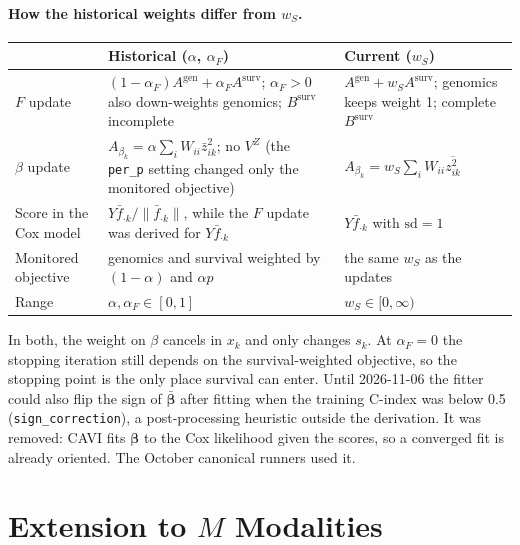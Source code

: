 \documentclass[11pt]{article}
\newcommand{\zbar}[2]{\bar{z}_{#1#2}}
\newcommand{\zsec}[2]{\overline{z^2_{#1#2}}}
\newcommand{\ws}{w_S}
\begin{document}
\paragraph{How the historical weights differ from $\ws$.}
\begin{center}
\begin{tabularx}{\textwidth}{>{\raggedright\arraybackslash}p{3.1cm}>{\raggedright\arraybackslash}X>{\raggedright\arraybackslash}X}
\toprule
 & Historical ($\alpha$, $\alpha_F$) & Current ($\ws$) \\
\midrule
$F$ update & $(1-\alpha_F)A^{\text{gen}} + \alpha_F A^{\text{surv}}$; $\alpha_F > 0$ also down-weights genomics; $B^{\text{surv}}$ incomplete & $A^{\text{gen}} + \ws A^{\text{surv}}$; genomics keeps weight 1; complete $B^{\text{surv}}$ \\
$\beta$ update & $A_{\beta_k} = \alpha\sum_i W_{ii}\zbar{i}{k}^2$; no $V^Z$ (the \texttt{per\_p} setting changed only the monitored objective) & $A_{\beta_k} = \ws\sum_i W_{ii}\zsec{i}{k}$ \\
Score in the Cox model & $Y\bar f_{\cdot k}/\lVert\bar f_{\cdot k}\rVert$, while the $F$ update was derived for $Y\bar f_{\cdot k}$ & $Y\bar f_{\cdot k}$ with $\mathrm{sd} = 1$ \\
Monitored objective & genomics and survival weighted by $(1-\alpha)$ and $\alpha p$ & the same $\ws$ as the updates \\
Range & $\alpha,\alpha_F\in[0,1]$ & $\ws\in[0,\infty)$ \\
\bottomrule
\end{tabularx}
\end{center}
In both, the weight on $\beta$ cancels in $x_k$ and only changes $s_k$. At $\alpha_F = 0$ the stopping iteration still depends on the
survival-weighted objective, so the stopping point is the only place survival
can enter. Until 2026-11-06 the fitter could also flip the sign of
$\bar{\bm\beta}$ after fitting when the training C-index was below 0.5
(\texttt{sign\_correction}), a post-processing heuristic outside the derivation.
It was removed: CAVI fits $\bm\beta$ to the Cox likelihood given the scores, so a
converged fit is already oriented. The October canonical runners used it.

\section{Extension to $M$ Modalities}\label{sec:multimodal}
\end{document}
